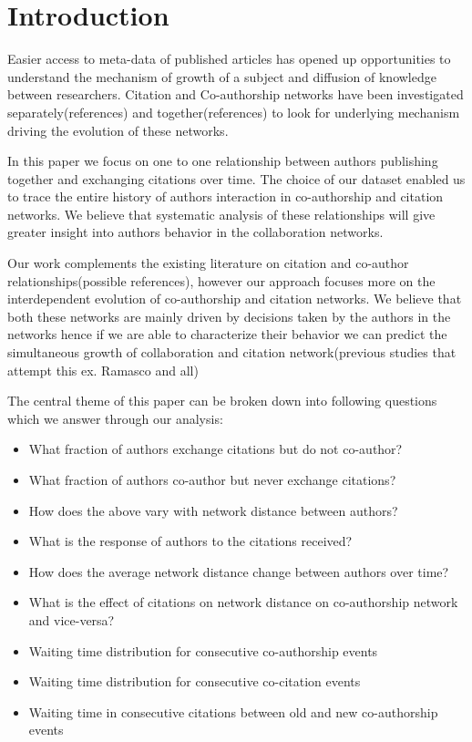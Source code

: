 \documentclass[aps, pre, twocolumn, nofootinbib]{revtex4-1}
\begin{document}
\section{Introduction}

Easier access to meta-data of published articles has opened up opportunities to understand the mechanism of growth of a subject and diffusion of knowledge between researchers. Citation and Co-authorship networks have been investigated separately(references) and together(references) to look for underlying mechanism driving the evolution of these networks.

In this paper we focus on one to one relationship between authors publishing together and exchanging citations over time. The choice of our dataset enabled us to trace the entire history of authors interaction in co-authorship and citation networks. We believe that systematic analysis of these relationships will give greater insight into authors behavior in the collaboration networks. 

Our work complements the existing literature on citation and co-author relationships(possible references), however our approach focuses more on the interdependent evolution of co-authorship and citation networks. We believe that both these networks are mainly driven by decisions taken by the authors in the networks hence if we are able to characterize their behavior we can predict the simultaneous growth of collaboration and citation network(previous studies that attempt this ex. Ramasco and all)

The central theme of this paper can be broken down into following questions which we answer through our analysis:

\begin{itemize}
	\item What fraction of authors exchange citations but do not co-author?
	\item What fraction of authors co-author but never exchange citations?
	\item How does the above vary with network distance between authors?
	\item What is the response of authors to the citations received?
	\item How does the average network distance change between authors over time?
	\item What is the effect of citations on network distance on co-authorship network and vice-versa?
	\item Waiting time distribution for consecutive co-authorship events
	\item Waiting time distribution for consecutive co-citation events
	\item Waiting time in consecutive citations between old and new co-authorship events
\end{itemize}
\end{document}
